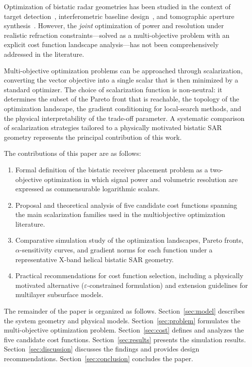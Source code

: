 \documentclass[journal]{IEEEtran}
\begin{document}
Optimization of bistatic radar geometries has been studied in the context of
target detection~\cite{willis1991}, interferometric baseline
design~\cite{krieger2006}, and tomographic aperture synthesis~\cite{reigber2000,
tebaldini2012}. However, the \emph{joint} optimization of power and resolution
under realistic refraction constraints—solved as a multi-objective problem with
an explicit cost function landscape analysis—has not been comprehensively
addressed in the literature.

Multi-objective optimization problems can be approached through scalarization,
converting the vector objective into a single scalar that is then minimized by a
standard optimizer. The choice of scalarization function is non-neutral: it
determines the subset of the Pareto front that is reachable, the topology of
the optimization landscape, the gradient conditioning for local-search methods,
and the physical interpretability of the trade-off parameter. A systematic
comparison of scalarization strategies tailored to a physically motivated
bistatic SAR geometry represents the principal contribution of this work.

The contributions of this paper are as follows:
\begin{enumerate}
  \item Formal definition of the bistatic receiver placement problem as a
    two-objective optimization in which signal power and volumetric resolution
    are expressed as commensurable logarithmic scalars.
  \item Proposal and theoretical analysis of five candidate cost functions
    spanning the main scalarization families used in the multiobjective
    optimization literature.
  \item Comparative simulation study of the optimization landscapes, Pareto
    fronts, $\alpha$-sensitivity curves, and gradient norms for each function
    under a representative X-band helical bistatic SAR geometry.
  \item Practical recommendations for cost function selection, including a
    physically motivated alternative ($\varepsilon$-constrained formulation)
    and extension guidelines for multilayer subsurface models.
\end{enumerate}

The remainder of the paper is organized as follows. Section~\ref{sec:model}
describes the system geometry and physical models. Section~\ref{sec:problem}
formulates the multi-objective optimization problem. Section~\ref{sec:cost}
defines and analyzes the five candidate cost functions.
Section~\ref{sec:results} presents the simulation results. Section~\ref{sec:discussion}
discusses the findings and provides design recommendations. Section~\ref{sec:conclusion}
concludes the paper.
\end{document}
